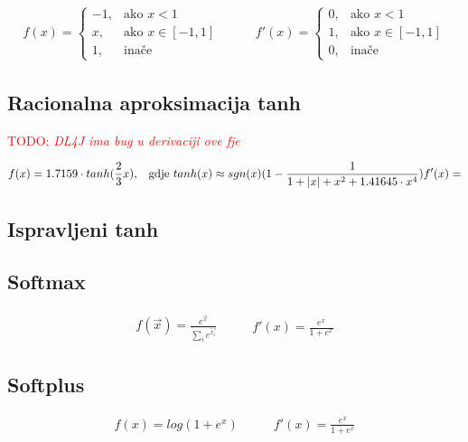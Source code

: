 \documentclass[times, utf8, diplomski]{fer}
\def\TODO#1{\noindent\textcolor{red}{TODO: \textit{#1}}\newline}
\def\todo#1{\TODO{#1}}
\begin{document}
\begin{equation}
\begin{split}
f(x) =
\begin{cases}
-1,	 		& \text{ako } x < 1 \\
x,	 		& \text{ako } x \in [-1,1] \\
1,	& \text{inače}
\end{cases}
\end{split}
\qquad
\begin{split}
f'(x) =
\begin{cases}
0,	 		& \text{ako } x < 1 \\
1,	 		& \text{ako } x \in [-1,1] \\
0,	& \text{inače}
\end{cases}
\end{split}
\end{equation}

\subsection*{Racionalna aproksimacija tanh}

\todo{DL4J ima bug u derivaciji ove fje}

\begin{equation}
f(x) = 1.7159 \cdot tanh(\frac{2}{3}x)\text{,\quad gdje }
tanh(x) \approx sgn(x)(1 - \frac{1}{1 + |x| + x^2 + 1.41645 \cdot x^4}) \\
f'(x) =
\end{equation}

\subsection*{Ispravljeni tanh}

\subsection*{Softmax}
\begin{equation}
\begin{split}
f(\vec{x}) = \frac{e^{\vec{x}}}{\sum_ie^{\vec{x_i}}}
\end{split}
\qquad
\begin{split}
f'(x) = \frac{e^x}{1+e^x}
\end{split}
\end{equation}

\subsection*{Softplus}
\begin{equation}
\begin{split}
f(x) = log(1+e^x)
\end{split}
\qquad
\begin{split}
f'(x) = \frac{e^x}{1+e^x}
\end{split}
\end{equation}
\end{document}
